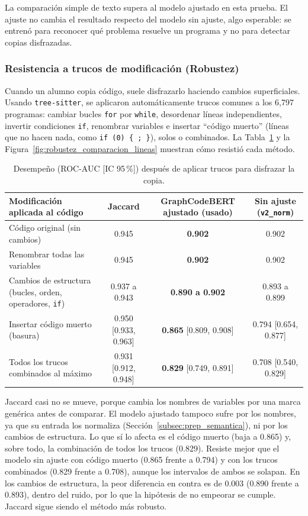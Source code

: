 La comparación simple de texto supera al modelo ajustado en esta prueba. El ajuste no cambia el resultado respecto del modelo sin ajuste, algo esperable: se entrenó para reconocer qué problema resuelve un programa y no para detectar copias disfrazadas.

\subsubsection{Resistencia a trucos de modificación (Robustez)}
\label{subsec:robustez_canal_a}
Cuando un alumno copia código, suele disfrazarlo haciendo cambios superficiales. Usando \texttt{tree-sitter}, se aplicaron automáticamente trucos comunes a los 6,797 programas: cambiar bucles \texttt{for} por \texttt{while}, desordenar líneas independientes, invertir condiciones \texttt{if}, renombrar variables e insertar ``código muerto'' (líneas que no hacen nada, como \texttt{if (0) \{ ; \}}), solos o combinados. La Tabla~\ref{tab:robustez_canal_a} y la Figura~\ref{fig:robustez_comparacion_lineas} muestran cómo resistió cada método.

\begin{table}[H]
    \centering
    \caption{Desempeño (ROC-AUC [IC 95\,\%]) después de aplicar trucos para disfrazar la copia.}
    \label{tab:robustez_canal_a}
    \renewcommand{\arraystretch}{1.2}
    \small
    \begin{tabularx}{\textwidth}{|X|c|c|c|}
        \hline
        \textbf{Modificación aplicada al código} & \textbf{Jaccard} & \textbf{GraphCodeBERT ajustado (usado)} & \textbf{Sin ajuste (\texttt{v2\_norm})} \\ \hline
        Código original (sin cambios) & 0.945 & \textbf{0.902} & 0.902 \\ \hline
        Renombrar todas las variables & 0.945 & \textbf{0.902} & 0.902 \\ \hline
        Cambios de estructura (bucles, orden, operadores, \texttt{if}) & 0.937 a 0.943 & \textbf{0.890 a 0.902} & 0.893 a 0.899 \\ \hline
        Insertar código muerto (basura) & 0.950 [0.933, 0.963] & \textbf{0.865} [0.809, 0.908] & 0.794 [0.654, 0.877] \\ \hline
        Todos los trucos combinados al máximo & 0.931 [0.912, 0.948] & \textbf{0.829} [0.749, 0.891] & 0.708 [0.540, 0.829] \\ \hline
    \end{tabularx}
\end{table}

Jaccard casi no se mueve, porque cambia los nombres de variables por una marca genérica antes de comparar. El modelo ajustado tampoco sufre por los nombres, ya que su entrada los normaliza (Sección~\ref{subsec:prep_semantica}), ni por los cambios de estructura. Lo que sí lo afecta es el código muerto (baja a 0.865) y, sobre todo, la combinación de todos los trucos (0.829). Resiste mejor que el modelo sin ajuste con código muerto (0.865 frente a 0.794) y con los trucos combinados (0.829 frente a 0.708), aunque los intervalos de ambos se solapan. En los cambios de estructura, la peor diferencia en contra es de 0.003 (0.890 frente a 0.893), dentro del ruido, por lo que la hipótesis de no empeorar se cumple. Jaccard sigue siendo el método más robusto.

